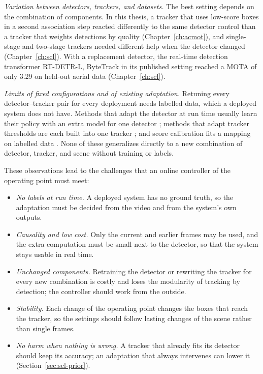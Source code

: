 \emph{Variation between detectors, trackers, and datasets.} The best setting depends on the combination of components. In this thesis, a tracker that uses low-score boxes in a second association step reacted differently to the same detector control than a tracker that weights detections by quality (Chapter~\ref{ch:acmot}), and single-stage and two-stage trackers needed different help when the detector changed (Chapter~\ref{ch:scl}). With a replacement detector, the real-time detection transformer RT-DETR-L, ByteTrack in its published setting reached a MOTA of only 3.29 on held-out aerial data (Chapter~\ref{ch:scl}).

\emph{Limits of fixed configurations and of existing adaptation.} Retuning every detector--tracker pair for every deployment needs labelled data, which a deployed system does not have. Methods that adapt the detector at run time usually learn their policy with an extra model for one detector \cite{han2022dynamic,chin2019adascale,xu2020approxdet}; methods that adapt tracker thresholds are each built into one tracker \cite{ma2023adaptivebytetrack,shim2024adaptrack,act2026adaptive}; and score calibration fits a mapping on labelled data \cite{kuppers2020detcalib}. None of these generalizes directly to a new combination of detector, tracker, and scene without training or labels.

These observations lead to the challenges that an online controller of the operating point must meet:
\begin{itemize}
\item \emph{No labels at run time.} A deployed system has no ground truth, so the adaptation must be decided from the video and from the system's own outputs.
\item \emph{Causality and low cost.} Only the current and earlier frames may be used, and the extra computation must be small next to the detector, so that the system stays usable in real time.
\item \emph{Unchanged components.} Retraining the detector or rewriting the tracker for every new combination is costly and loses the modularity of tracking by detection; the controller should work from the outside.
\item \emph{Stability.} Each change of the operating point changes the boxes that reach the tracker, so the settings should follow lasting changes of the scene rather than single frames.
\item \emph{No harm when nothing is wrong.} A tracker that already fits its detector should keep its accuracy; an adaptation that always intervenes can lower it (Section~\ref{sec:scl-prior}).
\end{itemize}

